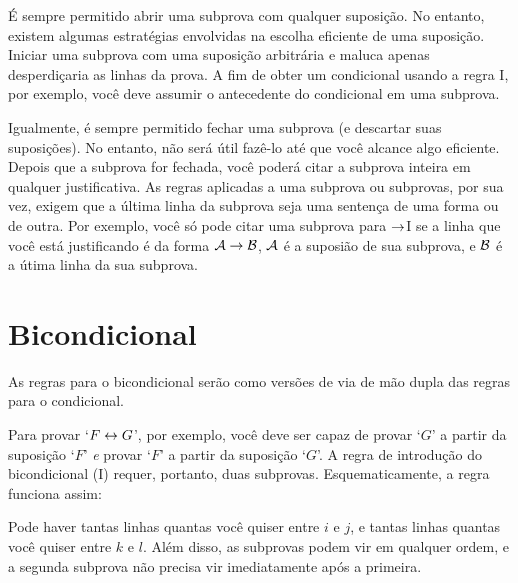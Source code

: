  

\'E sempre permitido abrir uma subprova com qualquer suposi\c c\~ao.  No entanto, existem algumas estrat\'egias envolvidas na escolha eficiente de uma suposi\c c\~ao.
Iniciar uma subprova com uma suposi\c c\~ao arbitr\'aria e maluca apenas desperdi\c caria as linhas da prova.  A fim de obter um condicional usando a regra {\eif}I, por exemplo, voc\^e deve assumir o antecedente do condicional em uma subprova.

Igualmente, \'e sempre permitido fechar uma subprova (e descartar suas suposi\c c\~oes). No entanto, n\~ao ser\'a \'util faz\^e-lo at\'e que voc\^e alcance algo eficiente.  Depois que a subprova for fechada, voc\^e poder\'a citar a subprova inteira em qualquer justificativa.  As regras aplicadas a uma subprova ou subprovas, por sua vez, exigem que  a \'ultima linha da subprova seja uma senten\c ca de uma forma ou de outra.   Por exemplo, voc\^e s\'o pode citar uma subprova para $\rightarrow$I se a linha que voc\^e est\'a justificando \'e da forma $\mathcal{A} \rightarrow \mathcal{B}$, $\mathcal{A}$  \'e a suposi\~ao de sua subprova, e $\mathcal{B}$ \'e a \'utima linha da sua subprova.


\section{Bicondicional}
As regras para o bicondicional ser\~ao como vers\~oes de via de m\~ao dupla das regras para o condicional. 

Para provar `$F \leftrightarrow G$',  por exemplo, voc\^e deve ser capaz de provar `$G$' a partir da  suposi\c c\~ao `$F$' \emph{e}  provar `$F$' a partir da suposi\c c\~ao `$G$'. A regra de introdu\c c\~ao do bicondicional ({\eiff}I) requer, portanto, duas subprovas.  Esquematicamente, a regra funciona assim: 

 

Pode haver tantas linhas quantas voc\^e quiser entre $i$ e $j$, e tantas linhas quantas voc\^e quiser entre $k$ e $l$.  Al\'em disso, as subprovas podem vir em qualquer ordem, e a segunda subprova n\~ao precisa vir imediatamente ap\'os a primeira.

